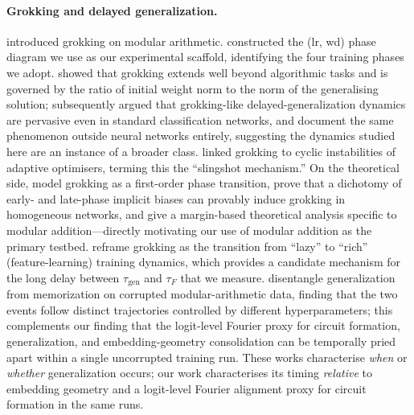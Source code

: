 \documentclass{article}
\newcommand{\taug}{\tau_{\mathrm{gen}}}
\newcommand{\tauf}{\tau_{F}}
\begin{document}
\paragraph{Grokking and delayed generalization.}
\citet{power2022grokking} introduced grokking on modular arithmetic.
\citet{liu2022towards} constructed the (lr, wd) phase diagram we
use as our experimental scaffold, identifying the four training
phases we adopt.
\citet{liu2023omnigrok} showed that grokking extends well beyond
algorithmic tasks and is governed by the ratio of initial weight
norm to the norm of the generalising solution;
\citet{humayun2024deep} subsequently argued that grokking-like
delayed-generalization dynamics are pervasive even in standard
classification networks, and \citet{miller2024grokking} document
the same phenomenon outside neural networks entirely, suggesting
the dynamics studied here are an instance of a broader class.
\citet{thilak2022slingshot} linked grokking to cyclic instabilities
of adaptive optimisers, terming this the ``slingshot mechanism.''
On the theoretical side, \citet{rubin2024grokking} model grokking
as a first-order phase transition, \citet{lyu2024dichotomy}
prove that a dichotomy of early- and late-phase implicit biases
can provably induce grokking in homogeneous networks, and
\citet{mohamadi2024grok} give a margin-based theoretical analysis
specific to modular addition---directly motivating our use of
modular addition as the primary testbed.
\citet{kumar2024lazy} reframe grokking as the transition from
``lazy'' to ``rich'' (feature-learning) training dynamics, which
provides a candidate mechanism for the long delay between
$\taug$ and $\tauf$ that we measure.
\citet{doshi2024grok} disentangle generalization from memorization
on corrupted modular-arithmetic data, finding that the two events
follow distinct trajectories controlled by different hyperparameters;
this complements our finding that the logit-level Fourier proxy
for circuit formation, generalization, and embedding-geometry
consolidation can be temporally pried apart within a single
uncorrupted training run.
These works characterise \emph{when} or \emph{whether} generalization
occurs; our work characterises its timing \emph{relative} to
embedding geometry and a logit-level Fourier alignment proxy for
circuit formation in the same runs.
\end{document}
